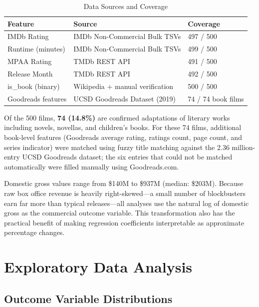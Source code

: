 \documentclass[11pt]{article}
\begin{document}
\begin{table}[H]
\centering
\caption{Data Sources and Coverage}
\begin{tabular}{lll}
\toprule
\textbf{Feature} & \textbf{Source} & \textbf{Coverage} \\
\midrule
IMDb Rating         & IMDb Non-Commercial Bulk TSVs   & 497 / 500 \\
Runtime (minutes)   & IMDb Non-Commercial Bulk TSVs   & 499 / 500 \\
MPAA Rating         & TMDb REST API                   & 491 / 500 \\
Release Month       & TMDb REST API                   & 492 / 500 \\
is\_book (binary)   & Wikipedia + manual verification & 500 / 500 \\
Goodreads features  & UCSD Goodreads Dataset (2019)   & 74 / 74 book films \\
\bottomrule
\end{tabular}
\end{table}

Of the 500 films, \textbf{74 (14.8\%)} are confirmed adaptations of literary works including novels, novellas, and children's books. For these 74 films, additional book-level features (Goodreads average rating, ratings count, page count, and series indicator) were matched using fuzzy title matching against the 2.36 million-entry UCSD Goodreads dataset; the six entries that could not be matched automatically were filled manually using Goodreads.com.

Domestic gross values range from \$140M to \$937M (median: \$203M). Because raw box office revenue is heavily right-skewed---a small number of blockbusters earn far more than typical releases---all analyses use the natural log of domestic gross as the commercial outcome variable. This transformation also has the practical benefit of making regression coefficients interpretable as approximate percentage changes.

\section{Exploratory Data Analysis}

\subsection{Outcome Variable Distributions}
\end{document}
